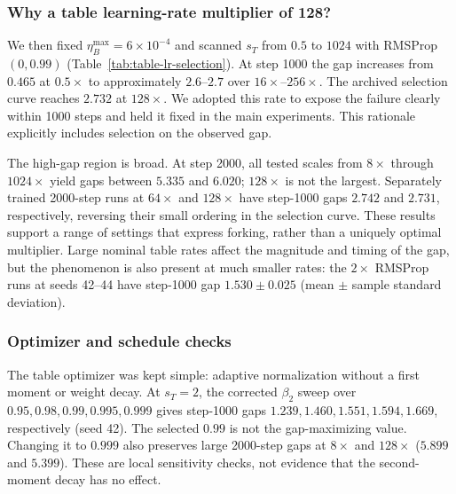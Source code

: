 \subsubsection{Why a table learning-rate multiplier of 128?}

We then fixed $\eta_B^{\max}=6\times10^{-4}$ and scanned $s_T$ from $0.5$ to $1024$ with RMSProp $(0,0.99)$ (Table~\ref{tab:table-lr-selection}). At step 1000 the gap increases from $0.465$ at $0.5\times$ to approximately $2.6$--$2.7$ over $16\times$--$256\times$. The archived selection curve reaches $2.732$ at $128\times$. We adopted this rate to expose the failure clearly within 1000 steps and held it fixed in the main experiments. This rationale explicitly includes selection on the observed gap.

The high-gap region is broad. At step 2000, all tested scales from $8\times$ through $1024\times$ yield gaps between $5.335$ and $6.020$; $128\times$ is not the largest. Separately trained 2000-step runs at $64\times$ and $128\times$ have step-1000 gaps $2.742$ and $2.731$, respectively, reversing their small ordering in the selection curve. These results support a range of settings that express forking, rather than a uniquely optimal multiplier. Large nominal table rates affect the magnitude and timing of the gap, but the phenomenon is also present at much smaller rates: the $2\times$ RMSProp runs at seeds 42--44 have step-1000 gap $1.530\pm0.025$ (mean $\pm$ sample standard deviation).

\begin{table}[!htbp]
\centering\small
\caption{Table-rate selection and extended-budget sensitivity. Backbone rate $0.0006$, RMSProp $(0,0.99)$, seed 42. Train, validation, and $G_{1000}$ use the archived selection curve. For $32\times$, $64\times$, and $128\times$, $G_{2000}$ comes from a separate longer run; for the other extended scales, both readouts come from the same run. Dashes denote no 2000-step result in this scan.}
\label{tab:table-lr-selection}

\end{table}

\subsubsection{Optimizer and schedule checks}

The table optimizer was kept simple: adaptive normalization without a first moment or weight decay. At $s_T=2$, the corrected $\beta_2$ sweep over $0.95,0.98,0.99,0.995,0.999$ gives step-1000 gaps $1.239,1.460,1.551,1.594,1.669$, respectively (seed 42). The selected $0.99$ is not the gap-maximizing value. Changing it to $0.999$ also preserves large 2000-step gaps at $8\times$ and $128\times$ ($5.899$ and $5.399$). These are local sensitivity checks, not evidence that the second-moment decay has no effect.

